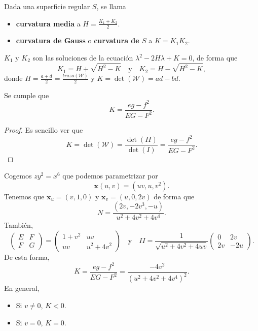 \begin{definition}
Dada una superficie regular $\displaystyle S $, se llama 
\begin{itemize}
\item \textbf{curvatura media} a $\displaystyle H = \frac{K_{1} + K_{2}}{2} $.
\item \textbf{curvatura de Gauss} o \textbf{curvatura de $\displaystyle S $} a $\displaystyle K=K_{1}K_{2} $.
\end{itemize}
\end{definition}
\begin{colorary}
$\displaystyle K_{1} $ y $\displaystyle K_{2} $ son las soluciones de la ecuación $\displaystyle \lambda^{2}-2H\lambda + K = 0 $, de forma que 
\[K_{1} = H+\sqrt{H^{2}-K} \quad \text{y} \quad K_{2}=H-\sqrt{H^{2}-K} ,\]
donde $\displaystyle H = \frac{a + d}{2}=\frac{traza\left(\mathcal{W}\right)}{2} $ y $\displaystyle K = \det\left(\mathcal{W}\right)=ad - bd $.
\end{colorary}
\begin{theorem}
Se cumple que 
\[K = \frac{eg-f^{2}}{EG-F^{2}} .\]
\end{theorem}
\begin{proof}
Es sencillo ver que 
\[K = \det\left(\mathcal{W}\right) = \frac{\det\left(II\right)}{\det\left(I\right)}=\frac{eg-f^{2}}{EG-F^{2}} .\]
\end{proof}
\begin{eg}
	Cogemos $\displaystyle zy^{2}=x^{6} $ que podemos parametrizar por 
	\[ \textbf{x} \left(u,v\right)=\left(uv,u,v^{2}\right) .\]
	Tenemos que $\displaystyle \textbf{x} _{u}=\left(v,1,0\right) $ y $\displaystyle \textbf{x} _{v}=\left(u,0,2v\right) $ de forma que 
	\[N = \frac{\left(2v, -2v^{3}, -u\right)}{u^{2}+4v^{2}+4v^{4}} .\]
	También, 
	\[\begin{pmatrix} E & F \\ F & G \end{pmatrix}=\begin{pmatrix} 1 + v^{2} & uv \\ uv & u^{2} + 4v^{2} \end{pmatrix} \quad \text{y} \quad II =\frac{1}{\sqrt{u^{2}+4v^{2}+4uv}}\begin{pmatrix} 0 & 2v \\ 2v & - 2u \end{pmatrix} .\]
De esta forma, 
\[K = \frac{eg-f^{2}}{EG-F^{2}}=\frac{-4v^{2}}{\left(u^{2}+4v^{2}+4v^{4}\right)^{2}} .\]
En general, 
\begin{itemize}
\item Si $\displaystyle v \neq 0 $, $\displaystyle K < 0 $. 
\item Si $\displaystyle v = 0 $, $\displaystyle K = 0 $. 
\end{itemize}
\end{eg}
